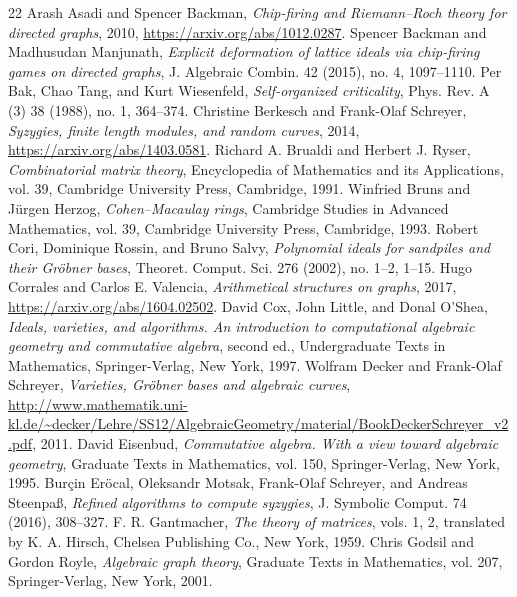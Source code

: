 \documentclass[10pt]{amsart}
\theoremstyle{definition}
\theoremstyle{remark}
\begin{document}
\begin{thebibliography}{22}
 Arash Asadi and Spencer Backman, \emph{Chip-firing and Riemann--Roch theory for directed graphs}, 2010, \url{https://arxiv.org/abs/1012.0287}.
 Spencer Backman and Madhusudan Manjunath, \emph{Explicit deformation of lattice ideals via chip-firing games on directed graphs}, J. Algebraic Combin. 42 (2015), no. 4, 1097--1110.
 Per Bak, Chao Tang, and Kurt Wiesenfeld, \emph{Self-organized criticality}, Phys. Rev. A (3) 38 (1988), no. 1, 364--374.
 Christine Berkesch and Frank-Olaf Schreyer, \emph{Syzygies, finite length modules, and random curves}, 2014, \url{https://arxiv.org/abs/1403.0581}.
 Richard A. Brualdi and Herbert J. Ryser, \emph{Combinatorial matrix theory}, Encyclopedia of Mathematics and its Applications, vol. 39, Cambridge University Press, Cambridge, 1991.
 Winfried Bruns and J\"{u}rgen Herzog, \emph{Cohen--Macaulay rings}, Cambridge Studies in Advanced Mathematics, vol. 39, Cambridge University Press, Cambridge, 1993.
 Robert Cori, Dominique Rossin, and Bruno Salvy, \emph{Polynomial ideals for sandpiles and their Gr\"{o}bner bases}, Theoret. Comput. Sci. 276 (2002), no. 1--2, 1--15.
 Hugo Corrales and Carlos E. Valencia, \emph{Arithmetical structures on graphs}, 2017, \url{https://arxiv.org/abs/1604.02502}.
 David Cox, John Little, and Donal O'Shea, \emph{Ideals, varieties, and algorithms. An introduction to computational algebraic geometry and commutative algebra}, second ed., Undergraduate Texts in Mathematics, Springer-Verlag, New York, 1997.
 Wolfram Decker and Frank-Olaf Schreyer, \emph{Varieties, Gr\"{o}bner bases and algebraic curves}, \url{http://www.mathematik.uni-kl.de/~decker/Lehre/SS12/AlgebraicGeometry/material/BookDeckerSchreyer_v2.pdf}, 2011.
 David Eisenbud, \emph{Commutative algebra. With a view toward algebraic geometry}, Graduate Texts in Mathematics, vol. 150, Springer-Verlag, New York, 1995.
 Bur\c{c}in Er\"{o}cal, Oleksandr Motsak, Frank-Olaf Schreyer, and Andreas Steenpa\ss, \emph{Refined algorithms to compute syzygies}, J. Symbolic Comput. 74 (2016), 308--327.
 F. R. Gantmacher, \emph{The theory of matrices}, vols. 1, 2, translated by K. A. Hirsch, Chelsea Publishing Co., New York, 1959.
 Chris Godsil and Gordon Royle, \emph{Algebraic graph theory}, Graduate Texts in Mathematics, vol. 207, Springer-Verlag, New York, 2001.

\end{thebibliography}
\end{document}
